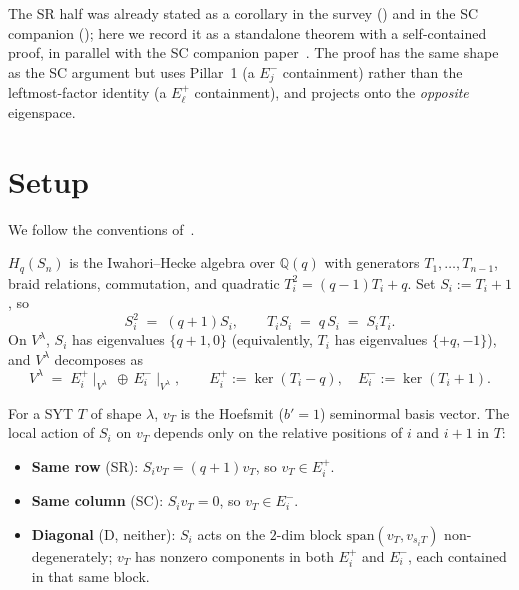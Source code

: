 \documentclass[11pt]{article}
\theoremstyle{definition}
\newcommand{\Hq}{H_q}
\newcommand{\Sn}{S_n}
\newcommand{\Vlam}{V^\lambda}
\newcommand{\Eplus}{E^+}
\newcommand{\Eminus}{E^-}
\begin{document}
The SR half was already stated as a corollary in the survey
(\cite[Cor.~6.2]{survey}) and in the SC companion
(\cite[Cor.~3]{leftmostPerSYT}); here we record it as a standalone
theorem with a self-contained proof, in parallel with the SC companion
paper~\cite{leftmostPerSYT}. The proof has the same shape as
the SC argument but uses Pillar~1 (a $\Eminus_j$ containment) rather than
the leftmost-factor identity (a $\Eplus_\ell$ containment), and projects
onto the \emph{opposite} eigenspace.

\section{Setup}\label{sec:setup}

We follow the conventions of~\cite{pillar1,leftmostPerSYT,survey}.

$\Hq(\Sn)$ is the Iwahori--Hecke algebra over $\mathbb{Q}(q)$ with
generators $T_1, \ldots, T_{n-1}$, braid relations, commutation, and
quadratic $T_i^2 = (q-1)T_i + q$. Set $S_i := T_i + 1$, so
\begin{equation}\label{eq:hecke-abs}
   S_i^2 \;=\; (q+1) S_i,
   \qquad T_i S_i \;=\; q\,S_i \;=\; S_i T_i.
\end{equation}
On $\Vlam$, $S_i$ has eigenvalues $\{q+1, 0\}$ (equivalently, $T_i$ has
eigenvalues $\{+q, -1\}$), and $\Vlam$ decomposes as
\begin{equation}\label{eq:plus-minus-decomp}
   \Vlam \;=\; \Eplus_i \!\mid_{\Vlam} \,\oplus\, \Eminus_i \!\mid_{\Vlam},
   \qquad
   \Eplus_i := \ker(T_i - q), \quad
   \Eminus_i := \ker(T_i + 1).
\end{equation}

For a SYT $T$ of shape $\lambda$, $v_T$ is the Hoefsmit ($b'\!=\!1$)
seminormal basis vector. The local action of $S_i$ on $v_T$ depends only on
the relative positions of $i$ and $i+1$ in $T$:
\begin{itemize}[topsep=0.2em,itemsep=0.1em]
\item \textbf{Same row} (SR): $S_i v_T = (q+1) v_T$, so $v_T \in \Eplus_i$.
\item \textbf{Same column} (SC): $S_i v_T = 0$, so $v_T \in \Eminus_i$.
\item \textbf{Diagonal} (D, neither): $S_i$ acts on the $2$-dim block
   $\mathrm{span}(v_T, v_{s_i T})$ non-degenerately; $v_T$ has nonzero
   components in both $\Eplus_i$ and $\Eminus_i$, each contained in that
   same block.
\end{itemize}
\end{document}
